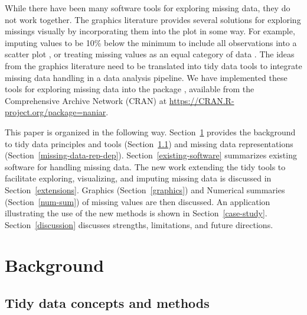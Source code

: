 \documentclass[article]{jss}
\begin{document}
While there have been many software tools for exploring missing data, they
do not work together.  The graphics literature provides several solutions
for exploring missings visually by incorporating them into the plot in some
way.  For example, imputing values to be 10\% below the minimum to include
all observations into a scatter plot \citep{Cook2007}, or treating missing
values as an equal category of data \citep{Unwin1996}.  The ideas from the
graphics literature need to be translated into tidy data tools to integrate
missing data handling in a data analysis pipeline. We have implemented these tools for exploring missing data into the  package  \citep{pkg:naniar}, available from the Comprehensive  Archive Network (CRAN) at \url{https://CRAN.R-project.org/package=naniar}.

This paper is organized in the following way.  Section~\ref{background}
provides the background to tidy data principles and tools
(Section~\ref{tidy-data-concepts}) and missing data representations
(Section~\ref{missing-data-rep-dep}).  Section~\ref{existing-software} summarizes
existing software for handling missing data.  The new work extending the
tidy tools to facilitate exploring, visualizing, and imputing missing data
is discussed in Section~\ref{extensions}.  Graphics (Section~\ref{graphics}) and
Numerical summaries (Section~\ref{num-sum}) of missing values are then discussed.
An application illustrating the use of the new methods is shown in
Section~\ref{case-study}.  Section~\ref{discussion} discusses strengths,
limitations, and future directions.

\hypertarget{background}{%
\section{Background}\label{background}}

\hypertarget{tidy-data-concepts}{%
\subsection{Tidy data concepts and methods}\label{tidy-data-concepts}}
\end{document}
